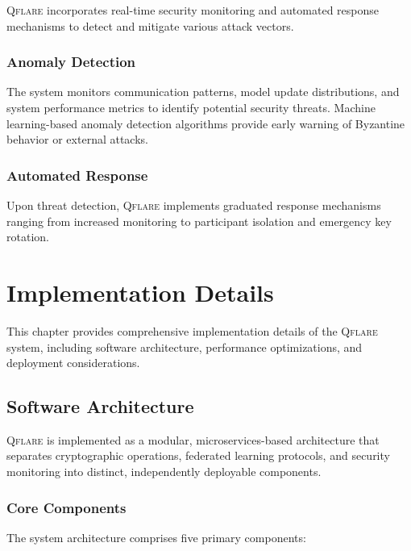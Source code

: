 \documentclass[12pt,a4paper,twoside]{book}
\newcommand{\qflare}{\textsc{Qflare}}
\begin{document}
\qflare{} incorporates real-time security monitoring and automated response mechanisms to detect and mitigate various attack vectors.

\subsection{Anomaly Detection}
\label{subsec:anomaly-detection}

The system monitors communication patterns, model update distributions, and system performance metrics to identify potential security threats. Machine learning-based anomaly detection algorithms provide early warning of Byzantine behavior or external attacks.

\subsection{Automated Response}
\label{subsec:automated-response}

Upon threat detection, \qflare{} implements graduated response mechanisms ranging from increased monitoring to participant isolation and emergency key rotation.

\chapter{Implementation Details}
\label{ch:implementation}

This chapter provides comprehensive implementation details of the \qflare{} system, including software architecture, performance optimizations, and deployment considerations.

\section{Software Architecture}
\label{sec:software-architecture}

\qflare{} is implemented as a modular, microservices-based architecture that separates cryptographic operations, federated learning protocols, and security monitoring into distinct, independently deployable components.

\subsection{Core Components}
\label{subsec:core-components}

The system architecture comprises five primary components:
\end{document}
